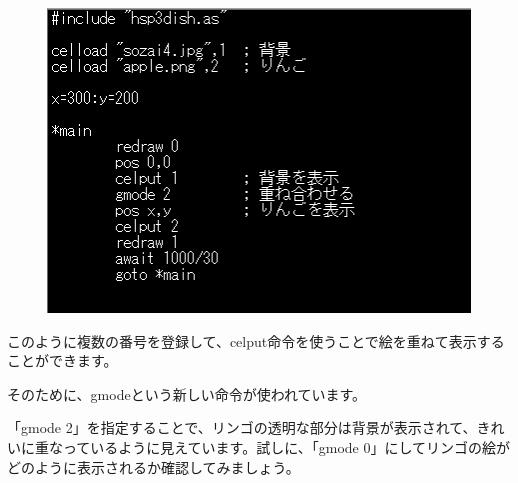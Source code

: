 \begin{figure}[H]
    \begin{center}
      \includegraphics[keepaspectratio,width=11.245cm,height=8.07cm]{text04-img/text04-img017.png}
    \end{center}
    \label{fig:prog_menu}
\end{figure}

このように複数の番号を登録して、celput命令を使うことで絵を重ねて表示することができます。

そのために、gmodeという新しい命令が使われています。


\begin{description}
    \item {}
\end{description}


\begin{description}
    \item {}
    \item {}
    \item {}
    \item {}
    \item {}
    \item {}
\end{description}

「gmode 2」を指定することで、リンゴの透明な部分は背景が表示されて、きれいに重なっているように見えています。試しに、「gmode 0」にしてリンゴの絵がどのように表示されるか確認してみましょう。

